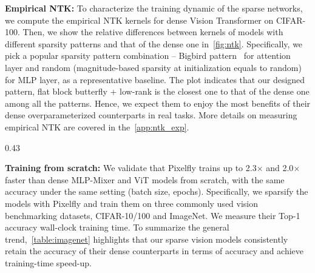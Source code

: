 \textbf{Empirical NTK:}
To characterize the training dynamic of the sparse networks, we compute the empirical NTK kernels for dense Vision Transformer on CIFAR-100. Then, we show the relative differences between kernels of models with different sparsity patterns and that of the dense one in~\cref{fig:ntk}. Specifically, we pick a popular sparsity pattern combination -- Bigbird pattern~\citep{zaheer2020bigbird} for attention layer and random (magnitude-based sparsity at initialization equals to random) for MLP layer, as a representative baseline. The plot indicates that our designed pattern, flat block butterfly + low-rank is the closest one to that of the dense one among all the patterns. Hence, we expect them to enjoy the most benefits of their dense overparameterized counterparts in real tasks. More details on measuring empirical NTK are covered in the~\cref{app:ntk_exp}.


\begin{wrapfigure}{}{0.43\textwidth}
    \vspace{-0.4cm}
\captionsetup{font=small}
    \iftoggle{arxiv}{
      \caption{Comparison with a representative sparse training baseline RigL~\citep{evci2020rigging}.}
    }{
    \caption{Comparison with a representative sparse training baseline RigL~\citep{evci2020rigging}. \vspace{-0.2cm}}
    }
      \centering
          	\label{fig:rigl}
	    \vspace{-0.2cm}
\end{wrapfigure}

\textbf{Training from scratch:} We validate that Pixelfly trains up to 2.3$\times$ and 2.0$\times$ faster than dense MLP-Mixer and ViT models from scratch, with the same accuracy under the same setting (batch size, epochs). Specifically, we sparsify the models with Pixelfly and train them on three commonly used vision benchmarking datasets, CIFAR-10/100 and ImageNet. We measure their Top-1 accuracy wall-clock training time.
To summarize the general trend,~\cref{table:imagenet} highlights that our sparse vision models consistently retain the accuracy of their dense counterparts in terms of accuracy and achieve training-time speed-up.



